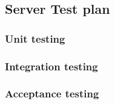\subsection{Server Test plan}
\subsubsection{Unit testing}

\subsubsection{Integration testing}

\subsubsection{Acceptance testing}
